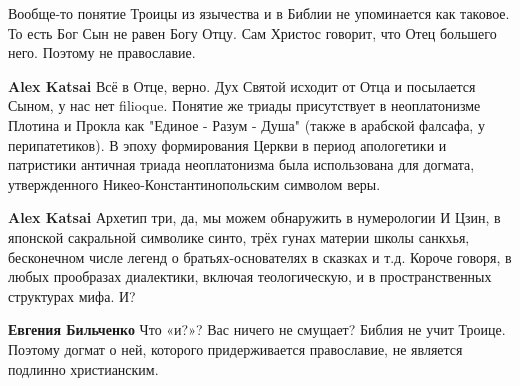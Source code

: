 \begin{itemize}
 

Вообще-то понятие Троицы из язычества и в Библии не упоминается как таковое. То
есть Бог Сын не равен Богу Отцу. Сам Христос говорит, что Отец большего него.
Поэтому не православие.

\begin{itemize}
 
\textbf{Alex Katsai} Всё в Отце, верно. Дух Святой исходит от Отца и посылается
Сыном, у нас нет filioque. Понятие же триады присутствует в неоплатонизме
Плотина и Прокла как "Единое - Разум - Душа" (также в арабской фалсафа, у
перипатетиков). В эпоху формирования Церкви в период апологетики и патристики
античная триада неоплатонизма была использована для догмата, утвержденного
Никео-Константинопольским символом веры.

 
\textbf{Alex Katsai} Архетип три, да, мы можем обнаружить в нумерологии И Цзин,
в японской сакральной символике синто, трёх гунах материи школы санкхья,
бесконечном числе легенд о братьях-основателях в сказках и т.д. Короче говоря,
в любых прообразах диалектики, включая теологическую, и в пространственных
структурах мифа. И?

 
\textbf{Евгения Бильченко} Что «и?»? Вас ничего не смущает? Библия не учит
Троице. Поэтому догмат о ней, которого придерживается православие, не является
подлинно христианским.

 

\end{itemize}
\end{itemize}
